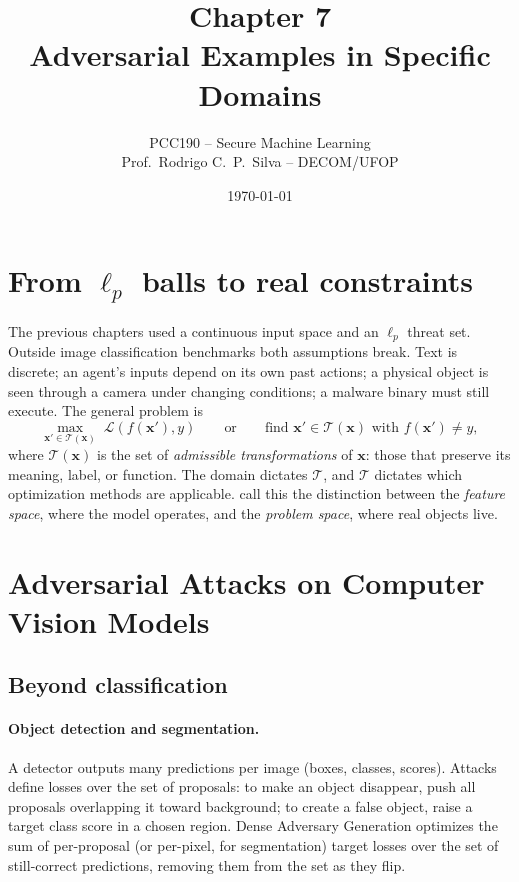 \documentclass[10pt,a4paper]{extarticle}
\title{Chapter 7\\Adversarial Examples in Specific Domains}
\author{PCC190 -- Secure Machine Learning\\Prof.\ Rodrigo C.\ P.\ Silva -- DECOM/UFOP}
\date{\today}
\theoremstyle{definition}
\newcommand{\Loss}{\mathcal{L}}
\newcommand{\x}{\mathbf{x}}
\newcommand{\xadv}{\mathbf{x}'}
\begin{document}
\maketitle
\thispagestyle{fancy}
\tableofcontents

\section*{From \(\ell_p\) balls to real constraints}

The previous chapters used a continuous input space and an \(\ell_p\) threat set. Outside image classification benchmarks both assumptions break. Text is discrete; an agent's inputs depend on its own past actions; a physical object is seen through a camera under changing conditions; a malware binary must still execute. The general problem is
\begin{equation}\label{eq:general}
\max_{\xadv\in\mathcal{T}(\x)}\;\Loss(f(\xadv),y)\qquad\text{or}\qquad \text{find } \xadv\in\mathcal{T}(\x)\text{ with } f(\xadv)\neq y,
\end{equation}
where \(\mathcal{T}(\x)\) is the set of \emph{admissible transformations} of \(\x\): those that preserve its meaning, label, or function. The domain dictates \(\mathcal{T}\), and \(\mathcal{T}\) dictates which optimization methods are applicable. \citet{pierazzi2020problemspace} call this the distinction between the \emph{feature space}, where the model operates, and the \emph{problem space}, where real objects live.

\section{Adversarial Attacks on Computer Vision Models}

\subsection{Beyond classification}

\paragraph{Object detection and segmentation.} A detector outputs many predictions per image (boxes, classes, scores). Attacks define losses over the set of proposals: to make an object disappear, push all proposals overlapping it toward background; to create a false object, raise a target class score in a chosen region. Dense Adversary Generation \citep{xie2017dag} optimizes the sum of per-proposal (or per-pixel, for segmentation) target losses over the set of still-correct predictions, removing them from the set as they flip.
\end{document}
